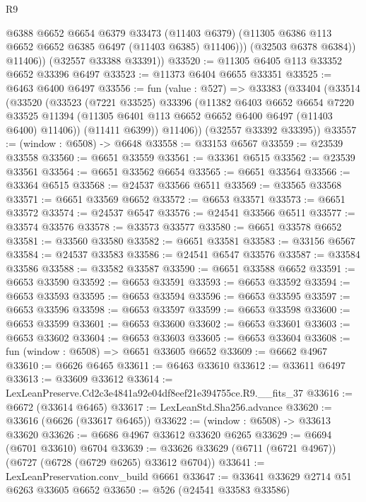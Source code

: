 \begin{lexlean}{R9}
\begin{coremodule}
                @6388
                @6652
                @6654
                @6379
                @33473
                (@11403 @6379)
                (@11305 @6386 @113 @6652 @6652 @6385 @6497 (@11403 @6385) @11406)))
            (@32503 @6378 @6384))
          @11406))
      (@32557 @33388 @33391))
@33520 := @11305 @6405 @113 @33352 @6652 @33396 @6497
@33523 := @11373 @6404 @6655 @33351
@33525 := @6463 @6400 @6497
@33556 := fun (value : @527) =>
  @33383
    (@33404
      (@33514
        (@33520
          (@33523
            (@7221 @33525)
            @33396
            (@11382
              @6403
              @6652
              @6654
              @7220
              @33525
              @11394
              (@11305 @6401 @113 @6652 @6652 @6400 @6497 (@11403 @6400) @11406))
            (@11411 @6399))
          @11406))
      (@32557 @33392 @33395))
@33557 := (window : @6508) -> @6648
@33558 := @33153 @6567
@33559 := @23539 @33558
@33560 := @6651 @33559
@33561 := @33361 @6515
@33562 := @23539 @33561
@33564 := @6651 @33562 @6654
@33565 := @6651 @33564
@33566 := @33364 @6515
@33568 := @24537 @33566 @6511
@33569 := @33565 @33568
@33571 := @6651 @33569 @6652
@33572 := @6653 @33571
@33573 := @6651 @33572
@33574 := @24537 @6547
@33576 := @24541 @33566 @6511
@33577 := @33574 @33576
@33578 := @33573 @33577
@33580 := @6651 @33578 @6652
@33581 := @33560 @33580
@33582 := @6651 @33581
@33583 := @33156 @6567
@33584 := @24537 @33583
@33586 := @24541 @6547 @33576
@33587 := @33584 @33586
@33588 := @33582 @33587
@33590 := @6651 @33588 @6652
@33591 := @6653 @33590
@33592 := @6653 @33591
@33593 := @6653 @33592
@33594 := @6653 @33593
@33595 := @6653 @33594
@33596 := @6653 @33595
@33597 := @6653 @33596
@33598 := @6653 @33597
@33599 := @6653 @33598
@33600 := @6653 @33599
@33601 := @6653 @33600
@33602 := @6653 @33601
@33603 := @6653 @33602
@33604 := @6653 @33603
@33605 := @6653 @33604
@33608 := fun (window : @6508) => @6651 @33605 @6652
@33609 := @6662 @4967
@33610 := @6626 @6465
@33611 := @6463 @33610
@33612 := @33611 @6497
@33613 := @33609 @33612
@33614 := LexLeanPreserve.Cd2c3e4841a92e04df8eef21e394755ce.R9.__fits_37
@33616 := @6672 (@33614 @6465)
@33617 := LexLeanStd.Sha256.advance
@33620 := @33616 (@6626 (@33617 @6465))
@33622 := (window : @6508) -> @33613 @33620
@33626 := @6686 @4967 @33612 @33620 @6265
@33629 := @6694 (@6701 @33610) @6704
@33639 := @33626 @33629 (@6711 (@6721 @4967)) (@6727 (@6728 (@6729 @6265) @33612 @6704))
@33641 := LexLeanPreservation.conv_build @6661
@33647 := @33641 @33629 @2714 @51 @6263 @33605 @6652
@33650 := @526 (@24541 @33583 @33586)

\end{coremodule}
\end{lexlean}
